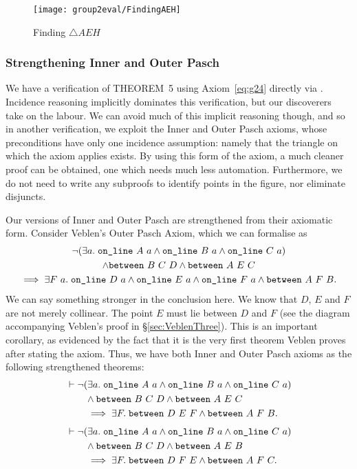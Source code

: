 \begin{figure}
\centering\texttt{[image: group2eval/FindingAEH]}
\caption{Finding $\triangle AEH$}
\label{fig:FindingAEH}
\end{figure}

\subsubsection{Strengthening Inner and Outer Pasch}\label{sec:StrengthenedPasch}
We have a verification of THEOREM~5 using Axiom~\ref{eq:g24} directly via . Incidence reasoning implicitly dominates this verification, but our discoverers take on the labour. We can avoid much of this implicit reasoning though, and so in another verification, we exploit the Inner and Outer Pasch axioms, whose preconditions have only one incidence assumption: namely that the triangle on which the axiom applies exists. By using this form of the axiom, a much cleaner proof can be obtained, one which needs much less automation. Furthermore, we do not need to write any subproofs to identify points in the figure, nor eliminate disjuncts.

Our versions of Inner and Outer Pasch are strengthened from their axiomatic form. Consider Veblen's Outer Pasch Axiom, which we can formalise as
\begin{multline*}
  \neg(\exists a.\; \texttt{on\_line}\ A\ a\wedge \texttt{on\_line}\ B\ a\wedge \texttt{on\_line}\ C\ a) \\\wedge \texttt{between}\ B\ C\ D \wedge \texttt{between}\ A\ E\ C\\ \implies \exists F\ a.\;  \texttt{on\_line}\ D\ a \wedge \texttt{on\_line}\ E\ a \wedge \texttt{on\_line}\ F\ a \wedge \texttt{between}\ A\ F\ B.
\end{multline*}
We can say something stronger in the conclusion here. We know that $D$, $E$ and $F$ are not merely collinear. The point $E$ must lie between $D$ and $F$ (see the diagram accompanying Veblen's proof in \S\ref{sec:VeblenThree}). This is an important corollary, as evidenced by the fact that it is the very first theorem Veblen proves after stating the axiom. Thus, we have both Inner and Outer Pasch axioms as the following strengthened theorems:
\begin{equation}\label{eq:OuterPasch}
  \begin{split}
    &\vdash\neg(\exists a.\; \texttt{on\_line}\ A\ a\wedge \texttt{on\_line}\ B\ a\wedge \texttt{on\_line}\ C\ a) \\
    &\qquad\wedge \texttt{between}\ B\ C\ D\wedge \texttt{between}\ A\ E\ C\\
    &\qquad\implies \exists F.\; \texttt{between}\ D\ E\ F \wedge \texttt{between}\ A\ F\ B.
  \end{split}
\end{equation}
\begin{equation}\label{eq:InnerPasch}
  \begin{split}
    &\vdash\neg(\exists a.\; \texttt{on\_line}\ A\ a\wedge \texttt{on\_line}\ B\ a\wedge \texttt{on\_line}\ C\ a) \\
    &\qquad\wedge \texttt{between}\ B\ C\ D \wedge \texttt{between}\ A\ E\ B\\ 
    &\qquad\implies \exists F.\; \texttt{between}\ D\ F\ E \wedge \texttt{between}\ A\ F\ C.
  \end{split}
\end{equation}

